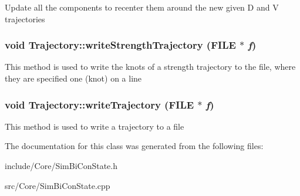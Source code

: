 \label{classCartWheel_1_1Core_1_1Trajectory_a7b1baee227c431fca148ef37fa5f2b6e}
Update all the components to recenter them around the new given D and V trajectories \hypertarget{classCartWheel_1_1Core_1_1Trajectory_a0b6041e87007f21fcad5df3cfaca9219}{
\subsubsection[{writeStrengthTrajectory}]{\setlength{\rightskip}{0pt plus 5cm}void Trajectory::writeStrengthTrajectory (FILE $\ast$ {\em f})}}
\label{classCartWheel_1_1Core_1_1Trajectory_a0b6041e87007f21fcad5df3cfaca9219}
This method is used to write the knots of a strength trajectory to the file, where they are specified one (knot) on a line \hypertarget{classCartWheel_1_1Core_1_1Trajectory_af33cc9518a6ad9cf3b837f0a6e885f39}{
\subsubsection[{writeTrajectory}]{\setlength{\rightskip}{0pt plus 5cm}void Trajectory::writeTrajectory (FILE $\ast$ {\em f})}}
\label{classCartWheel_1_1Core_1_1Trajectory_af33cc9518a6ad9cf3b837f0a6e885f39}
This method is used to write a trajectory to a file 

The documentation for this class was generated from the following files:\begin{DoxyCompactItemize}
\item 
include/Core/SimBiConState.h\item 
src/Core/SimBiConState.cpp\end{DoxyCompactItemize}
